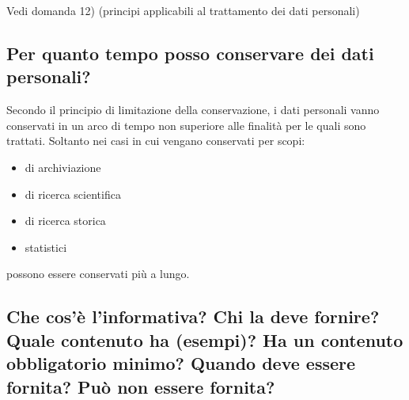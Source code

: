 Vedi domanda 12) (principi applicabili al trattamento dei dati personali)

\subsection{Per quanto tempo posso conservare dei dati personali?}

Secondo il principio di limitazione della conservazione, i dati personali vanno conservati in un arco di tempo non superiore alle finalità per le quali sono trattati.
\newline
Soltanto nei casi in cui vengano conservati per scopi:
\begin{itemize}
    \item di archiviazione
    \item di ricerca scientifica
    \item di ricerca storica
    \item statistici
\end{itemize}
possono essere conservati più a lungo.

\subsection{Che cos’è l’informativa? Chi la deve fornire? Quale contenuto ha (esempi)? Ha un contenuto
obbligatorio minimo? Quando deve essere fornita? Può non essere fornita?}

